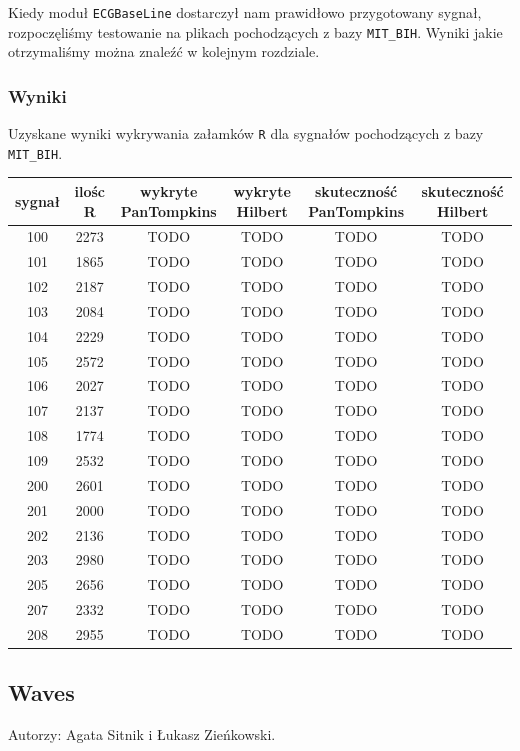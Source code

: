 \documentclass[a4paper, 11pt]{article}
\begin{document}
\indent Kiedy moduł \verb|ECGBaseLine| dostarczył nam prawidłowo przygotowany sygnał, rozpoczęliśmy testowanie na plikach pochodzących z bazy \verb|MIT_BIH|. Wyniki jakie otrzymaliśmy można znaleźć w kolejnym rozdziale.

\subsubsection{Wyniki}
\label{sec:rs:results}
Uzyskane wyniki wykrywania załamków \verb|R| dla sygnałów pochodzących z bazy \verb|MIT_BIH|.\\
\linebreak
\begin{tabular}{|c|c|c|c|c|c|}
\hline
sygnał & ilośc R & wykryte PanTompkins & wykryte Hilbert & skuteczność PanTompkins & skuteczność Hilbert\\ \hline
100   & 2273 & TODO & TODO  & TODO & TODO\\ \hline
101   & 1865 & TODO & TODO  & TODO & TODO\\ \hline
102   & 2187 & TODO & TODO  & TODO & TODO\\ \hline
103   & 2084 & TODO & TODO  & TODO & TODO\\ \hline
104   & 2229 & TODO & TODO  & TODO & TODO\\ \hline
105   & 2572 & TODO & TODO  & TODO & TODO\\ \hline
106   & 2027 & TODO & TODO  & TODO & TODO\\ \hline
107   & 2137 & TODO & TODO  & TODO & TODO\\ \hline
108   & 1774 & TODO & TODO  & TODO & TODO\\ \hline
109   & 2532 & TODO & TODO  & TODO & TODO\\ \hline
200   & 2601 & TODO & TODO  & TODO & TODO\\ \hline
201   & 2000 & TODO & TODO  & TODO & TODO\\ \hline
202   & 2136 & TODO & TODO  & TODO & TODO\\ \hline
203   & 2980 & TODO & TODO  & TODO & TODO\\ \hline
205   & 2656 & TODO & TODO  & TODO & TODO\\ \hline
207   & 2332 & TODO & TODO  & TODO & TODO\\ \hline
208   & 2955 & TODO & TODO  & TODO & TODO\\ \hline
\end{tabular}

\subsection{Waves}
\label{sec:waves}
Autorzy: Agata Sitnik i Łukasz Zieńkowski.
\end{document}
